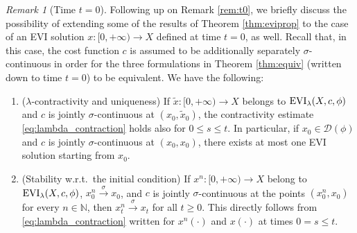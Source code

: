 \documentclass[reqno]{amsart}
\newcounter{results}[section]
\theoremstyle{plain}
\theoremstyle{remark}
\newtheorem{remark}[results]{Remark}
\theoremstyle{plain}
\numberwithin{equation}{section}
\theoremstyle{remark}
\newcommand{\N}{\mathbb{N}}
\newcommand{\dom}[1]{\mathscr{D}(#1)}
\DeclareMathOperator{\EVI}{{\rm EVI}}
\begin{document}
    \begin{remark}[Time $t=0$] Following up on Remark \ref{rem:t0}, we  briefly discuss the possibility of extending  
    some of the results of Theorem \ref{thm:eviprop}  to the case of  an EVI  solution  $x:[0,+\infty) \to X$ 
    defined  at time $t=0$,  as well.  Recall that, in this case, the cost function $c$ is assumed to be  additionally  separately $\sigma$-continuous in order for the three formulations in Theorem \ref{thm:equiv} (written down to time $t=0$) to be equivalent.  We have the following: 
    \begin{enumerate}
    \item  ($\lambda$-contractivity and uniqueness)  If $\tilde{x}: [0,+\infty) \to X$ belongs to $\EVI_\lambda(X,c,\phi)$ and $c$ is jointly $\sigma$-continuous at $(x_0, \tilde{x}_0)$,  the contractivity estimate  \eqref{eq:lambda_contraction} holds also for $0 \le s \le t$. In particular, if $x_0\in \dom{\phi}$ and $c$ is jointly $\sigma$-continuous at $(x_0, x_0)$, there exists at most one EVI solution starting from $x_0$.
    \item (Stability w.r.t.~the initial condition) If $x^n:[0,+\infty) \to X$ belong to $\EVI_\lambda(X,c,\phi)$, $ x^n_0\stackrel{\sigma}{\to}x_0$,  and $c$ is jointly $\sigma$-continuous at the points $(x_0^n, x_0)$ for every $n \in \N$,  then  $x^n_t \stackrel{\sigma}{\to}x_t$ for all  $t \ge 0$. This  directly  follows from \eqref{eq:lambda_contraction} written  for $x^n(\cdot)$ and $x(\cdot)$  at times $0=s\le t$.
        
    \end{enumerate}
        
    \end{remark}
\end{document}
